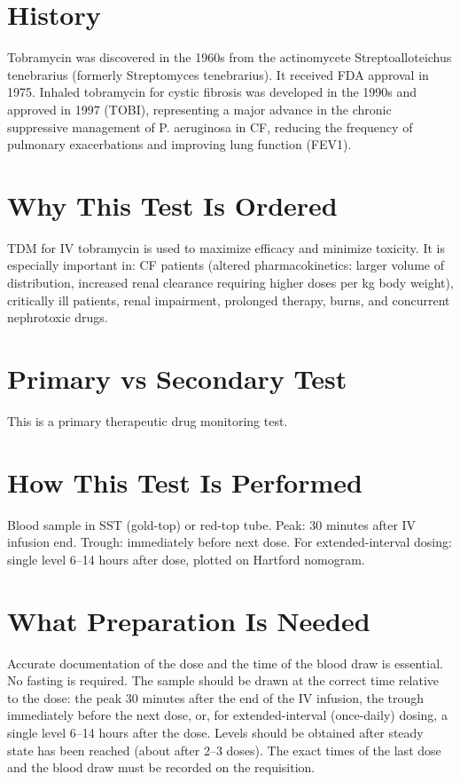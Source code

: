 \section*{History}
Tobramycin was discovered in the 1960s from the actinomycete Streptoalloteichus tenebrarius (formerly Streptomyces tenebrarius). It received FDA approval in 1975. Inhaled tobramycin for cystic fibrosis was developed in the 1990s and approved in 1997 (TOBI), representing a major advance in the chronic suppressive management of P. aeruginosa in CF, reducing the frequency of pulmonary exacerbations and improving lung function (FEV1).

\section*{Why This Test Is Ordered}
TDM for IV tobramycin is used to maximize efficacy and minimize toxicity. It is especially important in: CF patients (altered pharmacokinetics: larger volume of distribution, increased renal clearance requiring higher doses per kg body weight), critically ill patients, renal impairment, prolonged therapy, burns, and concurrent nephrotoxic drugs.

\section*{Primary vs Secondary Test}
This is a primary therapeutic drug monitoring test.

\section*{How This Test Is Performed}
Blood sample in SST (gold-top) or red-top tube. Peak: 30 minutes after IV infusion end. Trough: immediately before next dose. For extended-interval dosing: single level 6--14 hours after dose, plotted on Hartford nomogram.

\section*{What Preparation Is Needed}
Accurate documentation of the dose and the time of the blood draw is essential. No fasting is required. The sample should be drawn at the correct time relative to the dose: the peak 30 minutes after the end of the IV infusion, the trough immediately before the next dose, or, for extended-interval (once-daily) dosing, a single level 6--14 hours after the dose. Levels should be obtained after steady state has been reached (about after 2--3 doses). The exact times of the last dose and the blood draw must be recorded on the requisition.

